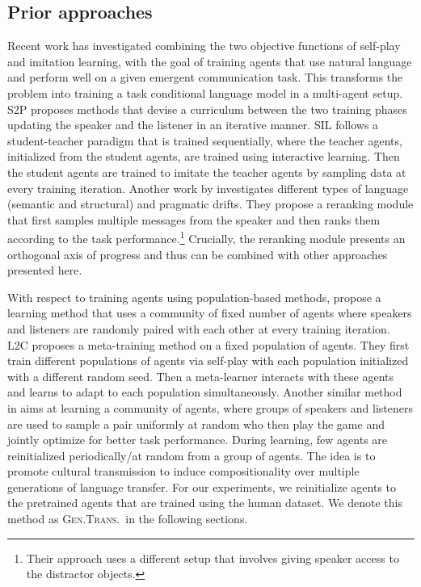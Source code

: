 \documentclass{article}
\newcommand{\ltc}{\textsc{L2C\xspace}}
\newcommand{\stp}{\textsc{S2P\xspace}}
\newcommand{\gentrans}{\textsc{Gen.Trans.\xspace}}
\newcommand{\sil}{\textsc{SIL\xspace}}
\begin{document}
\subsection{Prior approaches}
Recent work has investigated combining the two objective functions of self-play and imitation learning, with the goal of training agents that use natural language and perform well on a given emergent communication task. This transforms the problem into training a task conditional language model in a multi-agent setup. \stp \citep{lowe*2020on,gupta-etal-2019-seeded} proposes methods that devise a curriculum between the two training phases updating the speaker and the listener in an iterative manner. \sil \citep{DBLP:journals/corr/abs-2003-12694} follows a student-teacher paradigm that is trained sequentially, where the teacher agents, initialized from the student agents, are trained using interactive learning. Then the student agents are trained to imitate the teacher agents by sampling data at every training iteration. Another work by \citep{lazaridou-etal-2020-multi} investigates different types of language (semantic and structural) and pragmatic drifts. They propose a reranking module that first samples multiple messages from the speaker and then ranks them according to the task performance.\footnote{Their approach uses a different setup that involves giving speaker access to the distractor objects.} Crucially, the reranking module presents an orthogonal axis of progress and thus can be combined with other approaches presented here. 

With respect to training agents using population-based methods,
\citep{tieleman_shaping_2018} propose a learning method that uses a community of fixed number of agents where speakers and listeners are randomly paired with each other at every training iteration. \ltc \citep{lowe_learning_2019} proposes a meta-training method on a fixed population of agents. They first train different populations of agents via self-play with each population initialized with a different random seed. Then a meta-learner interacts with these agents and learns to adapt to each population simultaneously. Another similar method in \citep{cogswell_emergence_2019} aims at learning a community of agents, where groups of speakers and listeners are used to sample a pair uniformly at random who then play the game and jointly optimize for better task performance. During learning, few agents are reinitialized periodically/at random from a group of agents. The idea is to promote cultural transmission to induce compositionality over multiple generations of language transfer. For our experiments, we reinitialize agents to the pretrained agents that are trained using the human dataset. We denote this method as \gentrans\ in the following sections.
\end{document}
